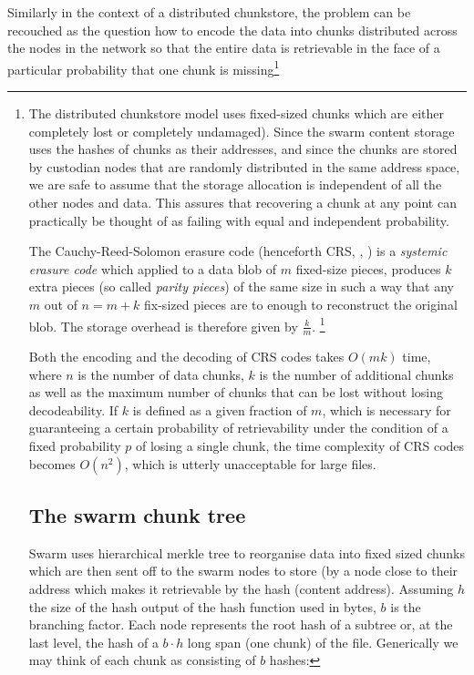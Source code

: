 \documentclass[12pt]{article}
\begin{document}
Similarly in the context of a distributed chunkstore, the problem can be recouched as the question how to encode the data into chunks distributed across the nodes in the network so that the entire data is retrievable in the face of a particular probability that one chunk is missing\footnote{The distributed chunkstore model uses fixed-sized chunks which are either completely lost or completely undamaged). Since the swarm content storage uses the hashes of chunks as their addresses, and since the chunks are stored by custodian nodes that are randomly distributed in the same address space, we are safe to assume that the storage allocation is independent of all the other nodes and data. This assures that recovering a chunk at any point can practically be thought of as failing with equal and independent probability.


The Cauchy-Reed-Solomon erasure code (henceforth CRS, \cite{lubyetal1995CRS}, \cite{plank2006optimizing}) is a \emph{systemic erasure code} which applied to a data blob of $m$ fixed-size pieces, produces $k$ extra pieces (so called \emph{parity pieces}) of the same size in such a way that any $m$ out of $n=m+k$ fix-sized pieces are to enough to reconstruct the original blob. The storage overhead is therefore given by $\frac{k}{m}$.%
%
\footnote{%
There are open source libraries that implement Reed Solomon or Cauchy-Reed-Solomon coding. See \cite{plank2009performance} for a thorough comparison.}

%
%

Both the encoding and the decoding of CRS codes takes $O(mk)$ time, where $n$ is the number of data chunks, $k$ is the number of additional chunks as well as the maximum number of chunks that can be lost without losing decodeability. If $k$ is defined as a given fraction of $m$, which is necessary for guaranteeing a certain probability of retrievability under the condition of a fixed probability $p$ of losing a single chunk, the time complexity of CRS codes becomes $O(n^2)$, which is utterly unacceptable for large files. %

\section{The swarm chunk tree}

Swarm uses hierarchical merkle tree \cite{merkle1980protocols} to reorganise data into fixed sized chunks which are then sent off to the swarm nodes to store (by a node close to their address which makes it retrievable by the hash (content address).
Assuming $h$ the size of the hash output of the hash function used in bytes, $b$ is the branching factor. Each node represents the root hash of a subtree or, at the last level, the hash of a $b\cdot h$ long span (one chunk) of the file. Generically we may think of each chunk as consisting of $b$ hashes:


}
\end{document}
